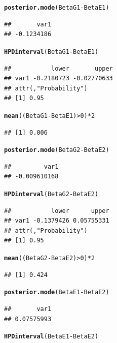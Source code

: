 \documentclass{article}\usepackage[]{graphicx}\usepackage[]{color}
\makeatletter
\newcommand{\hlnum}[1]{\textcolor[rgb]{0.686,0.059,0.569}{#1}}%
\newcommand{\hlopt}[1]{\textcolor[rgb]{0,0,0}{#1}}%
\newcommand{\hlstd}[1]{\textcolor[rgb]{0.345,0.345,0.345}{#1}}%
\newcommand{\hlkwd}[1]{\textcolor[rgb]{0.737,0.353,0.396}{\textbf{#1}}}%
\newenvironment{kframe}{%
 \def\at@end@of@kframe{}%
 \ifinner\ifhmode%
  \def\at@end@of@kframe{\end{minipage}}%
  \begin{minipage}{\columnwidth}%
 \fi\fi%
 \def\FrameCommand##1{\hskip\@totalleftmargin \hskip-\fboxsep
 \colorbox{shadecolor}{##1}\hskip-\fboxsep
     \hskip-\linewidth \hskip-\@totalleftmargin \hskip\columnwidth}%
 \MakeFramed {\advance\hsize-\width
   \@totalleftmargin\z@ \linewidth\hsize
   \@setminipage}}%
 {\par\unskip\endMakeFramed%
 \at@end@of@kframe}
\newenvironment{knitrout}{}{} %
\makeatother
\begin{document}
\begin{knitrout}
\color{fgcolor}\begin{kframe}
\begin{alltt}
\hlkwd{posterior.mode}\hlstd{(BetaG1} \hlopt{-} \hlstd{BetaE1)}
\end{alltt}
\begin{verbatim}
##       var1 
## -0.1234186
\end{verbatim}
\begin{alltt}
\hlkwd{HPDinterval}\hlstd{(BetaG1} \hlopt{-} \hlstd{BetaE1)}
\end{alltt}
\begin{verbatim}
##           lower       upper
## var1 -0.2180723 -0.02770633
## attr(,"Probability")
## [1] 0.95
\end{verbatim}
\begin{alltt}
\hlkwd{mean}\hlstd{((BetaG1} \hlopt{-} \hlstd{BetaE1)}\hlopt{>}\hlnum{0}\hlstd{)}\hlopt{*}\hlnum{2}
\end{alltt}
\begin{verbatim}
## [1] 0.006
\end{verbatim}
\begin{alltt}
\hlkwd{posterior.mode}\hlstd{(BetaG2} \hlopt{-} \hlstd{BetaE2)}
\end{alltt}
\begin{verbatim}
##         var1 
## -0.009610168
\end{verbatim}
\begin{alltt}
\hlkwd{HPDinterval}\hlstd{(BetaG2} \hlopt{-} \hlstd{BetaE2)}
\end{alltt}
\begin{verbatim}
##           lower      upper
## var1 -0.1379426 0.05755331
## attr(,"Probability")
## [1] 0.95
\end{verbatim}
\begin{alltt}
\hlkwd{mean}\hlstd{((BetaG2} \hlopt{-} \hlstd{BetaE2)}\hlopt{>}\hlnum{0}\hlstd{)}\hlopt{*}\hlnum{2}
\end{alltt}
\begin{verbatim}
## [1] 0.424
\end{verbatim}
\begin{alltt}
\hlkwd{posterior.mode}\hlstd{(BetaE1} \hlopt{-} \hlstd{BetaE2)}
\end{alltt}
\begin{verbatim}
##       var1 
## 0.07575993
\end{verbatim}
\begin{alltt}
\hlkwd{HPDinterval}\hlstd{(BetaE1} \hlopt{-} \hlstd{BetaE2)}

\end{alltt}
\end{kframe}
\end{knitrout}
\end{document}
